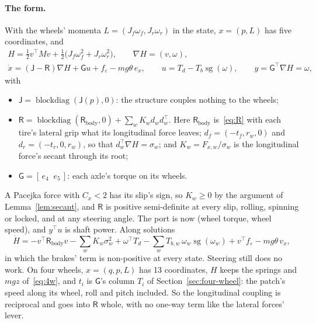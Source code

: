 \documentclass[11pt]{article}
\theoremstyle{remark}
\newcommand{\J}{\mathsf J}
\newcommand{\R}{\mathsf R}
\newcommand{\G}{\mathsf G}
\newcommand{\T}{^{\top}}
\begin{document}
\paragraph{The form.} With the wheels' momenta $L=(J_f\omega_f,J_r\omega_r)$ in the state,
$x=(p,L)$ has five coordinates, and
\begin{equation}
\begin{gathered}
  H=\tfrac12v\T Mv+\tfrac12\big(J_f\omega_f^2+J_r\omega_r^2\big),\qquad \nabla H=(v,\omega),\\
  \dot x=(\J-\R)\nabla H+\G u+f_\varepsilon-mg\theta\,e_x,\qquad
  u=T_d-T_b\operatorname{sg}(\omega),\qquad y=\G\T\nabla H=\omega,
\end{gathered}
  \label{eq:spin}
\end{equation}
with
\begin{itemize}
  \item $\J=\operatorname{blockdiag}(\J(p),0)$: the structure couples nothing to the wheels;
  \item $\R=\operatorname{blockdiag}(\R_{\mathrm{body}},0)+\sum_wK_wd_wd_w\T$. Here
        $\R_{\mathrm{body}}$ is~\eqref{eq:R} with each tire's lateral grip what its longitudinal
        force leaves; $d_f=(-t_f,r_w,0)$ and $d_r=(-t_r,0,r_w)$, so that $d_w\T\nabla H=\sigma_w$;
        and $K_w=F_{x,w}/\sigma_w$ is the longitudinal force's secant through its root;
  \item $\G=[\,e_4\;\;e_5\,]$: each axle's torque on its wheels.
\end{itemize}
A Pacejka force with $C_x<2$ has its slip's sign, so $K_w\ge0$ by the argument of
Lemma~\ref{lem:secant}, and $\R$ is positive semi-definite at every slip, rolling, spinning or
locked, and at any steering angle. The port is now (wheel torque, wheel speed), and $y\T u$ is
shaft power. Along solutions
\begin{equation}
  \dot H=-v\T\R_{\mathrm{body}}v-\textstyle\sum_wK_w\sigma_w^2+\omega\T T_d
  -\sum_wT_{b,w}\,\omega_w\operatorname{sg}(\omega_w)+v\T f_\varepsilon-mg\theta\,v_x ,
  \label{eq:spin-balance}
\end{equation}
in which the brakes' term is non-positive at every state. Steering still does no work. On four
wheels, $x=(q,p,L)$ has 13 coordinates, $H$ keeps the springs and $mgz$ of~\eqref{eq:4w}, and $t_i$
is $\G$'s column $T_i$ of Section~\ref{sec:four-wheel}: the patch's speed along its wheel, roll and
pitch included. So the longitudinal coupling is reciprocal and goes into $\R$ whole, with no
one-way term like the lateral forces' lever.
\end{document}
